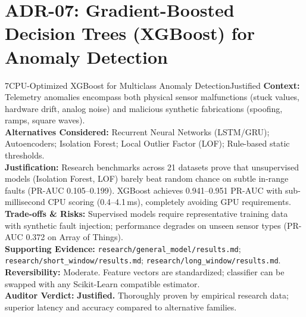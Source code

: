 \documentclass[10pt,a4paper]{report}
\begin{document}
\section{ADR-07: Gradient-Boosted Decision Trees (XGBoost) for Anomaly Detection}
\begin{adrbox}{7}{CPU-Optimized XGBoost for Multiclass Anomaly Detection}{Justified}
\textbf{Context:} Telemetry anomalies encompass both physical sensor malfunctions (stuck values, hardware drift, analog noise) and malicious synthetic fabrications (spoofing, ramps, square waves).\\
\textbf{Alternatives Considered:} Recurrent Neural Networks (LSTM/GRU); Autoencoders; Isolation Forest; Local Outlier Factor (LOF); Rule-based static thresholds.\\
\textbf{Justification:} Research benchmarks across 21 datasets prove that unsupervised models (Isolation Forest, LOF) barely beat random chance on subtle in-range faults (PR-AUC 0.105--0.199). XGBoost achieves 0.941--0.951 PR-AUC with sub-millisecond CPU scoring (0.4--4.1\,ms), completely avoiding GPU requirements.\\
\textbf{Trade-offs \& Risks:} Supervised models require representative training data with synthetic fault injection; performance degrades on unseen sensor types (PR-AUC 0.372 on Array of Things).\\
\textbf{Supporting Evidence:} \texttt{research/general\_model/results.md}; \texttt{research/short\_window/results.md}; \texttt{research/long\_window/results.md}.\\
\textbf{Reversibility:} Moderate. Feature vectors are standardized; classifier can be swapped with any Scikit-Learn compatible estimator.\\
\textbf{Auditor Verdict:} \textbf{Justified.} Thoroughly proven by empirical research data; superior latency and accuracy compared to alternative families.
\end{adrbox}
\end{document}
